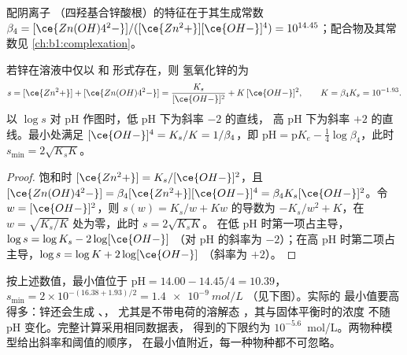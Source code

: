 配阴离子 （四羟基合锌酸根）的特征在于其生成常数
$\beta_4 = [\ce{Zn(OH)4^2-}]/\allowbreak([\ce{Zn^2+}][\ce{OH-}]^4)
\allowbreak = 10^{14.45}$；配合物及其常数见
\cref{ch:b1:complexation}。

\begin{proposition}[两性氢氧化物的溶解度]\label{prop:b1:precipitation:amphoteric}
若锌在溶液中仅以  和  形式存在，则
氢氧化锌的为
\[
  s = [\ce{Zn^2+}] + [\ce{Zn(OH)4^2-}] = \frac{K_s}{[\ce{OH-}]^2} + K\,[\ce{OH-}]^2,
  \qquad K = \beta_4 K_s = 10^{-1.93} .
\]
以 $\log s$ 对 pH 作图时，低 pH 下为斜率 $-2$ 的直线，
高 pH 下为斜率 $+2$ 的直线。最小处满足
$[\ce{OH-}]^4 = K_s/K = 1/\beta_4$，即 $\mathrm{pH} =
\mathrm{p}K_e - \frac14\log\beta_4$，此时 $s_{\min} = 2\sqrt{K_s K}$。
\end{proposition}

\begin{proof}
饱和时 $[\ce{Zn^2+}] = K_s/[\ce{OH-}]^2$，且
$[\ce{Zn(OH)4^2-}] = \beta_4[\ce{Zn^2+}][\ce{OH-}]^4 = \beta_4 K_s
[\ce{OH-}]^2$。令 $w = [\ce{OH-}]^2$，则 $s(w) = K_s/w + Kw$ 的导数为
$-K_s/w^2 + K$，在 $w = \sqrt{K_s/K}$ 处为零，此时 $s = 2\sqrt{K_s K}$。
在低 pH 时第一项占主导，$\log s = \log K_s - 2\log[\ce{OH-}]$
（对 pH 的斜率为 $-2$）；在高 pH 时第二项占主导，$\log s = \log K + 2\log[\ce{OH-}]$
（斜率为 $+2$）。
\end{proof}

按上述数值，最小值位于 $\mathrm{pH} = 14.00 - 14.45/4
= 10.39$，$s_{\min} = 2 \times 10^{-(16.38 + 1.93)/2} =
\qty{1.4e-9}{mol/L}$
（见下图）。实际的
最小值要高得多：锌还会生成 、，
尤其是不带电荷的溶解态 ，其与固体平衡时的浓度
不随 pH 变化。完整计算采用相同数据表，
得到的下限约为
$10^{-5.6}$~mol/L。两物种模型给出斜率和阈值的顺序，
在最小值附近，每一种物种都不可忽略。

